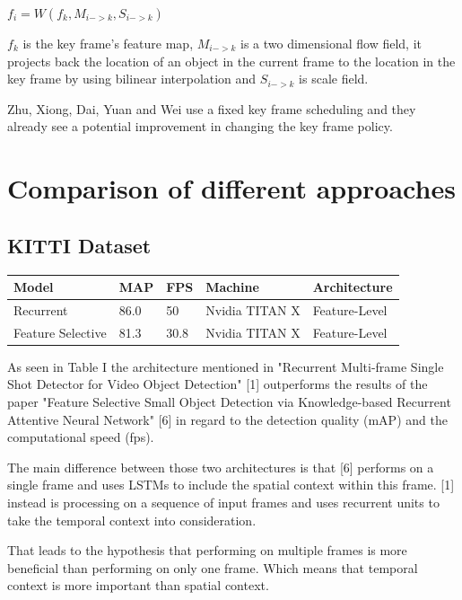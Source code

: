 \documentclass[conference]{IEEEtran}
\begin{document}
$ f_{i} =  W (f_{k},M_{i->k}, S_{i->k})$ \newline

$ f_{k} $ is the key frame's feature map, $ M_{i->k} $ is a two dimensional flow field, it projects back the location of an object in the current frame to the location in the key frame by using bilinear interpolation and  $ S_{i->k} $ is scale field. \newline

Zhu, Xiong, Dai, Yuan and Wei use a fixed key frame scheduling and they already see a potential improvement in changing the key frame policy. 

\section{Comparison of different approaches}

\subsection{KITTI Dataset}
\begin{tabular}{ | p{2cm} | p{2em}| p{2em} | p{4em} | p{5em} | } 
 \hline
 Model & MAP & FPS & Machine & Architecture \\
 \hline
 Recurrent \cite{b1} & 86.0 & 50 & Nvidia TITAN X & Feature-Level \\
 \hline
 Feature Selective \cite{b6} & 81.3 & 30.8 & Nvidia TITAN X & Feature-Level \\
 \hline
\end{tabular} \newline

As seen in Table I the architecture mentioned in "Recurrent Multi-frame Single Shot Detector for Video Object Detection" [1] outperforms the results of the paper "Feature Selective Small Object Detection via Knowledge-based Recurrent Attentive Neural Network" [6] in regard to the detection quality (mAP) and the computational speed (fps). \newline

The main difference between those two architectures is that [6] performs on a single frame and uses LSTMs to include the spatial context within this frame. [1] instead is processing on a sequence of input frames and uses recurrent units to take the temporal context into consideration. \newline

That leads to the hypothesis that performing on multiple frames is more beneficial than performing on only one frame. Which means that temporal context is more important than spatial context.   
\end{document}
